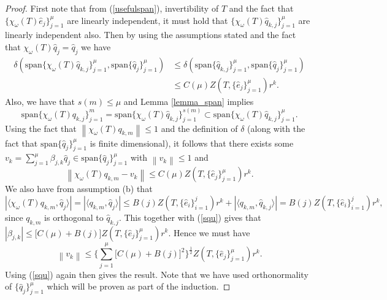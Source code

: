 \documentclass[a4paper,10pt]{article}
\begin{document}
\begin{proof}
First note that from (\ref{usefulspan}), invertibility of $T$ and the fact that $\{\chi_{\omega}(T)\hat e_j\}_{j=1}^\mu$ are linearly independent, it must hold that $\{\chi_{\omega}(T)\hat q_{k,j}\}_{j=1}^{\mu}$ are linearly independent also. Then by using the assumptions stated and the fact that $\chi_\omega(T)\hat q_j=\hat q_j$ we have
\begin{align*}
 \delta(\mathrm{span}\{\chi_{\omega}(T)\hat q_{k,j}\}_{j=1}^{\mu}, \mathrm{span}\{ \hat
 q_j\}_{j=1}^{\mu})&\leq\delta(\mathrm{span}\{\hat q_{k,j}\}_{j=1}^{\mu}, \mathrm{span}\{ \hat
 q_j\}_{j=1}^{\mu})\\
&\leq C(\mu)Z(T,\{\hat e_j\}_{j=1}^\mu)r^k.
\end{align*}
Also, we have that $s(m) \leq \mu$ and Lemma \ref{lemma_span} implies
$$
\mathrm{span}\{\chi_{\omega}(T) q_{k,j}\}_{j=1}^m =
  \mathrm{span}\{\chi_{\omega}(T) \hat q_{k,j}\}_{j=1}^{s(m)}\subset \mathrm{span}\{\chi_{\omega}(T) \hat q_{k,j}\}_{j=1}^{\mu}.
$$
Using the fact that $\left\|\chi_{\omega}(T)q_{k,m}\right\|\leq 1$ and the definition of $\delta$ (along with the fact that $\mathrm{span}\{ \hat q_j\}_{j=1}^{\mu}$ is finite dimensional), it follows that there exists some $v_k=\sum_{j=1}^\mu\beta_{j,k}{\hat q_j}\in\mathrm{span}\{\hat
 q_j\}_{j=1}^{\mu}$ with $\left\|v_k\right\|\leq 1$ and
\begin{equation}
\label{squ}
\left\|\chi_{\omega}(T)q_{k,m} -v_k\right\|\leq  C(\mu)Z(T,\{\hat e_j\}_{j=1}^\mu)r^k.
\end{equation}
We also have from assumption (b) that
\begin{equation}
\label{sq2}
\left|\langle \chi_{\omega}(T)q_{k,m},\hat q_j\rangle\right|=\left|\langle q_{k,m},\hat q_j\rangle\right|\leq B(j)Z(T,\{\hat e_i\}_{i=1}^j)r^k + \left|\langle q_{k,m},\hat q_{k,j}\rangle\right|=B(j)Z(T,\{\hat e_i\}_{i=1}^j)r^k,
\end{equation}
since $q_{k,m}$ is orthogonal to $\hat q_{k,j}$. This together with (\ref{squ}) gives that $\left|\beta_{j,k}\right|\leq\big[C(\mu)+B(j)\big]Z(T,\{\hat e_j\}_{j=1}^\mu)r^k$. Hence we must have
$$
\left\|v_k\right\|\leq \Big\{\sum_{j=1}^{\mu}\big[ C(\mu)+B(j)\big]^2\Big\}^{\frac{1}{2}}Z(T,\{\hat e_j\}_{j=1}^\mu)r^k.
$$
Using (\ref{squ}) again then gives the result. Note that we have used orthonormality of $\{\hat q_j\}_{j=1}^{\mu}$ which will be proven as part of the induction.
\end{proof}
\end{document}
